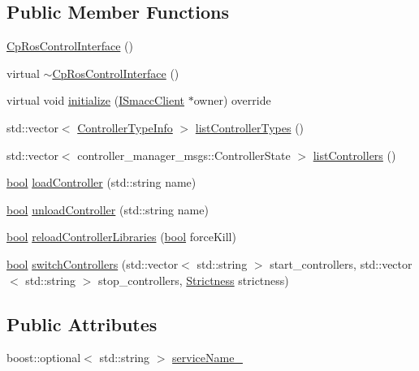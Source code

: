 \subsection*{Public Member Functions}
\begin{DoxyCompactItemize}
\item 
\hyperlink{classsmacc_1_1components_1_1CpRosControlInterface_a0748ed325fd16e4ce28650a4c4851337}{Cp\+Ros\+Control\+Interface} ()
\item 
virtual \hyperlink{classsmacc_1_1components_1_1CpRosControlInterface_a85ab7c698b5a1c0b0064775b2779daa8}{$\sim$\+Cp\+Ros\+Control\+Interface} ()
\item 
virtual void \hyperlink{classsmacc_1_1components_1_1CpRosControlInterface_adc7596526206c620bb67b58cab34fb90}{initialize} (\hyperlink{classsmacc_1_1ISmaccClient}{I\+Smacc\+Client} $\ast$owner) override
\item 
std\+::vector$<$ \hyperlink{structsmacc_1_1components_1_1ControllerTypeInfo}{Controller\+Type\+Info} $>$ \hyperlink{classsmacc_1_1components_1_1CpRosControlInterface_ae900aa88dff13169cdb22c68a7e5d539}{list\+Controller\+Types} ()
\item 
std\+::vector$<$ controller\+\_\+manager\+\_\+msgs\+::\+Controller\+State $>$ \hyperlink{classsmacc_1_1components_1_1CpRosControlInterface_ab5666d2b888f63fd6aeb1056ffec10cb}{list\+Controllers} ()
\item 
\hyperlink{classbool}{bool} \hyperlink{classsmacc_1_1components_1_1CpRosControlInterface_ab810c680f5429731c9c83345f9821016}{load\+Controller} (std\+::string name)
\item 
\hyperlink{classbool}{bool} \hyperlink{classsmacc_1_1components_1_1CpRosControlInterface_a0c65acff40f36a15c67fab7c77ca23c8}{unload\+Controller} (std\+::string name)
\item 
\hyperlink{classbool}{bool} \hyperlink{classsmacc_1_1components_1_1CpRosControlInterface_acd3534897ecf6b28ee3804dcbefedae9}{reload\+Controller\+Libraries} (\hyperlink{classbool}{bool} force\+Kill)
\item 
\hyperlink{classbool}{bool} \hyperlink{classsmacc_1_1components_1_1CpRosControlInterface_a1cdb86924bbc0ab5f932d5504a943cbb}{switch\+Controllers} (std\+::vector$<$ std\+::string $>$ start\+\_\+controllers, std\+::vector$<$ std\+::string $>$ stop\+\_\+controllers, \hyperlink{namespacesmacc_1_1components_a18117d6a71feb2471fb4e07f47674e4c}{Strictness} strictness)
\end{DoxyCompactItemize}
\subsection*{Public Attributes}
\begin{DoxyCompactItemize}
\item 
boost\+::optional$<$ std\+::string $>$ \hyperlink{classsmacc_1_1components_1_1CpRosControlInterface_ac7831d58e5de5a78ff0baeb876f9157b}{service\+Name\+\_\+}
\end{DoxyCompactItemize}
